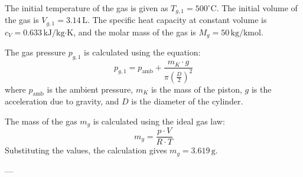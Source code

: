 The initial temperature of the gas is given as \( T_{g,1} = 500^\circ\text{C} \). The initial volume of the gas is \( V_{g,1} = 3.14 \, \text{L} \). The specific heat capacity at constant volume is \( c_V = 0.633 \, \text{kJ/kg·K} \), and the molar mass of the gas is \( M_g = 50 \, \text{kg/kmol} \).  

The gas pressure \( p_{g,1} \) is calculated using the equation:  
\[
p_{g,1} = p_{\text{amb}} + \frac{m_K \cdot g}{\pi \left( \frac{D}{2} \right)^2}
\]  
where \( p_{\text{amb}} \) is the ambient pressure, \( m_K \) is the mass of the piston, \( g \) is the acceleration due to gravity, and \( D \) is the diameter of the cylinder.  

The mass of the gas \( m_g \) is calculated using the ideal gas law:  
\[
m_g = \frac{p \cdot V}{R \cdot T}
\]  
Substituting the values, the calculation gives \( m_g = 3.619 \, \text{g} \).  

---